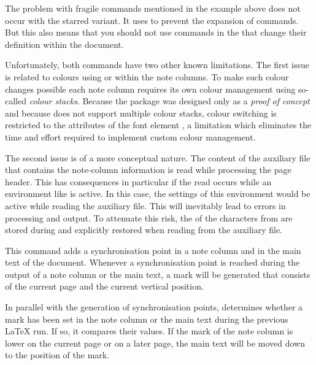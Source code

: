 The problem with fragile
commands mentioned in the example above does not occur with the starred
variant. It uses  to prevent
the expansion of commands. But this also means that you should not use
commands in the  that change their definition within the
document.

Unfortunately, both commands have two other known
limitations. The first issue is related to colours using
 or 
within the note columns. To make such colour changes possible each note column
requires its own colour management using so-called \emph{colour stacks}.
Because the package was designed only as a \emph{proof of concept} and because
\XeTeX{} does not support multiple colour stacks, \XeTeX{} colour switching is
restricted to the attributes of the font element
, a limitation which
eliminates the time and effort required to implement custom colour management.

The second issue is of a more conceptual nature. The content of the auxiliary
file that contains the note-column information is read while processing the
page header. This has consequences in particular if the read occurs while
an environment like  is active. In this case, the
 settings of this environment would be active while reading the
auxiliary file. This will inevitably lead to errors in processing and output.
To attenuate this risk, the  of the characters from
 are stored during
 and explicitly restored when reading from
the auxiliary file.%
\EndIndexGroup


\begin{Declaration}
\end{Declaration}
This command adds a
synchronisation point in a
note column and in the main text of the document. Whenever a synchronisation
point is reached during the output of a note column or the main text, a mark
will be generated that consists of the current page and the current vertical
position.

In parallel with the generation of synchronisation points,
 determines whether a mark has been set in the
note column or the main text during the previous \LaTeX{} run. If so, it
compares their values. If the mark of the note column is lower on the current
page or on a later page, the main text will be moved down to the position of
the mark.


